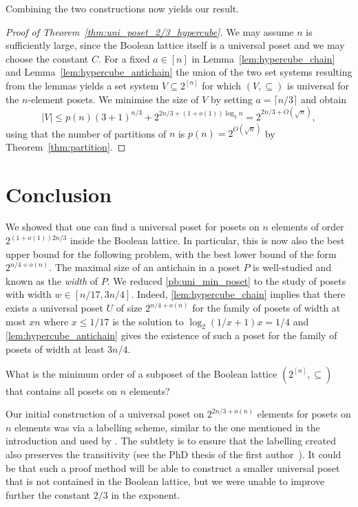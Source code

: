 \documentclass[11pt]{article}
\newcommand{\1}{\mathbbm{1}}
\begin{document}
Combining the two constructions now yields our result.
\begin{proof}[Proof of Theorem~\ref{thm:uni_poset_2/3_hypercube}]
   We may assume $n$ is sufficiently large, since the Boolean lattice itself is a universal poset and we may choose the constant $C$.
   For a fixed $a \in [n]$ in Lemma~\ref{lem:hypercube_chain} and Lemma~\ref{lem:hypercube_antichain} the union of the two set systems resulting from the lemmas yields a set system $V\subseteq 2^{[n]}$ for which $(V,\subseteq)$ is universal for the $n$-element posets. We minimise the size of $V$ by setting $a=\lceil n/3\rceil$ and obtain
\[
|V|\leq p(n) (3+1)^{n/3}+2^{2n/3+(1+o(1))\log_2 n}=2^{2n/3+O(\sqrt{n})}, 
\] 
using that the number of partitions of $n$ is $p(n)=2^{O(\sqrt{n})}$ by Theorem~\ref{thm:partition}.
\end{proof}


\section{Conclusion}
We showed that one can find a universal poset for posets on $n$ elements of order $2^{(1+o(1))2n/3}$ inside the Boolean lattice. In particular, this is now also the best upper bound for the following problem, with the best lower bound of the form $2^{n/4+o(n)}$. The maximal size of an antichain in a poset $P$ is well-studied and known as the \emph{width} of $P$. We reduced \cref{pb:uni_min_poset} to the study of posets with width $w \in [n/17, 3n/4]$. Indeed, \cref{lem:hypercube_chain} implies that there exists a universal poset $U$ of size $2^{n/4 + o(n)}$ for the family of posets of width at most $xn$ where $x\leq 1/17$ is the solution to $\log_2(1/x+1)x=1/4$
and \cref{lem:hypercube_antichain} gives the existence of such a poset for the family of posets of width at least $3n/4$.

\begin{problem}
\label{prob:3}
    What is the minimum order of a subposet of the Boolean lattice $(2^{[n]},\subseteq)$ that contains all posets on $n$ elements?
\end{problem}

Our initial construction of a universal poset on $2^{2n/3+o(n)}$ elements for posets on $n$ elements was via a labelling scheme, similar to the one mentioned in the introduction and used by  \cite{DulebaGawrychowskiJanczewski,bonamy2021optimal}. The subtlety is to ensure that the labelling created also preserves the transitivity (see the PhD thesis of the first author~\cite{paulthesis}). It could be that such a proof method will be able to construct a smaller universal poset that is not contained in the Boolean lattice, but we were unable to improve further the constant $2/3$ in the exponent.
\end{document}
